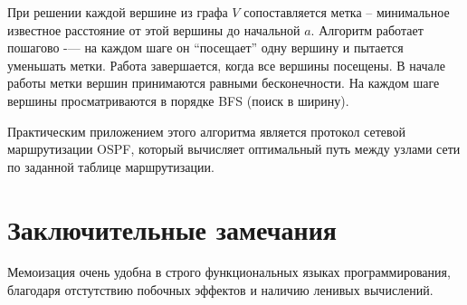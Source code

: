 \documentclass[11pt]{article}
\begin{document}
При решении каждой вершине из графа $V$ сопоставляется метка -- минимальное известное расстояние от этой вершины до начальной $a$. Алгоритм работает пошагово -— на каждом шаге он ``посещает'' одну вершину и пытается уменьшать метки. Работа завершается, когда все вершины посещены. В начале работы метки вершин принимаются равными бесконечности. На каждом шаге вершины просматриваются в порядке BFS (поиск в ширину).

Практическим приложением этого алгоритма является протокол сетевой маршрутизации OSPF, который вычисляет оптимальный путь между узлами сети по заданной таблице маршрутизации.

\section{Заключительные замечания}

Мемоизация очень удобна в строго функциональных языках программирования, благодаря отстутствию побочных эффектов и наличию ленивых вычислений.
\end{document}
